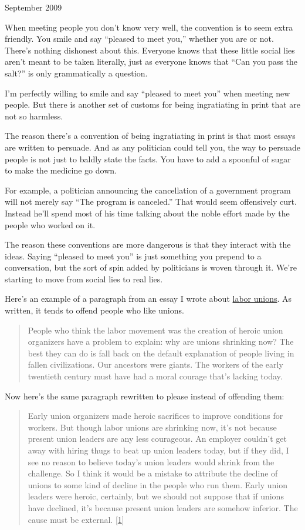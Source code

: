 September 2009

When meeting people you don't know very well, the convention is to seem
extra friendly. You smile and say ``pleased to meet you,'' whether you
are or not. There's nothing dishonest about this. Everyone knows that
these little social lies aren't meant to be taken literally, just as
everyone knows that ``Can you pass the salt?'' is only grammatically a
question.

I'm perfectly willing to smile and say ``pleased to meet you'' when
meeting new people. But there is another set of customs for being
ingratiating in print that are not so harmless.

The reason there's a convention of being ingratiating in print is that
most essays are written to persuade. And as any politician could tell
you, the way to persuade people is not just to baldly state the facts.
You have to add a spoonful of sugar to make the medicine go down.

For example, a politician announcing the cancellation of a government
program will not merely say ``The program is canceled.'' That would seem
offensively curt. Instead he'll spend most of his time talking about the
noble effort made by the people who worked on it.

The reason these conventions are more dangerous is that they interact
with the ideas. Saying ``pleased to meet you'' is just something you
prepend to a conversation, but the sort of spin added by politicians is
woven through it. We're starting to move from social lies to real lies.

Here's an example of a paragraph from an essay I wrote about
\href{unions.html}{labor unions}. As written, it tends to offend people
who like unions.

\begin{quote}
People who think the labor movement was the creation of heroic union
organizers have a problem to explain: why are unions shrinking now? The
best they can do is fall back on the default explanation of people
living in fallen civilizations. Our ancestors were giants. The workers
of the early twentieth century must have had a moral courage that's
lacking today.
\end{quote}

Now here's the same paragraph rewritten to please instead of offending
them:

\begin{quote}
Early union organizers made heroic sacrifices to improve conditions for
workers. But though labor unions are shrinking now, it's not because
present union leaders are any less courageous. An employer couldn't get
away with hiring thugs to beat up union leaders today, but if they did,
I see no reason to believe today's union leaders would shrink from the
challenge. So I think it would be a mistake to attribute the decline of
unions to some kind of decline in the people who run them. Early union
leaders were heroic, certainly, but we should not suppose that if unions
have declined, it's because present union leaders are somehow inferior.
The cause must be external. {[}\hyperref[f1n]{1}{]}
\end{quote}

